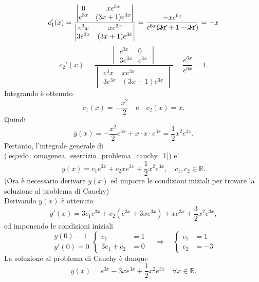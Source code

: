 \begin{example}
	\begin{equation*}
		c_1'(x)=
		\frac{
		\begin{vmatrix}
			0 & x e^{3x}\\
			e^{3x} & (3x+1) e^{3x}
		\end{vmatrix}
		}{
		\begin{vmatrix}
			e^3x & x e^{3x}\\
			3 e^{3x} & (3x+1) e^{3x}
		\end{vmatrix}
		}= \frac{-xe^{6x}}{e^{6x}(\cancel{3x}+1-\cancel{3x})} = -x
	\end{equation*}
	\begin{equation*}
		c_2'(x)=
		\frac{
			\begin{vmatrix}
				e^{3x} & 0\\
				3e^{3x} & e^{3x}
			\end{vmatrix}
		}{
			\begin{vmatrix}
				e^3x & x e^{3x}\\
				3 e^{3x} & (3x+1) e^{3x}
			\end{vmatrix}
		}= \frac{e^{6x}}{e^{6x}} = 1.
	\end{equation*}
	Integrando è ottenuto
	\begin{equation*}
		c_1(x) = -\frac{x^2}{2}\quad\text{e}\quad c_2(x) = x.
	\end{equation*}
	Quindi
	\begin{equation*}
		\bar y(x) = -\frac{x^2}{2} e^{3x} + x\cdot x\cdot e^{3x} = \frac{1}{2} x^2 e^{3x}.
	\end{equation*}
	Pertanto, l'integrale generale di (\ref{eq:edo_omogenea_esercizio_problema_cauchy_1}) e'
	\begin{equation*}
		y(x) = c_1 e^{3x} + c_2 x e^{3x} + \frac{1}{2} x^2 e ^{3x},\quad c_1,c_2\in\mathbb{R}.
	\end{equation*}
	(Ora è necessario derivare $y(x)$ ed imporre le condizioni iniziali per trovare la soluzione al problema di Cauchy)\\
	Derivando $y(x)$ è ottenuto
	\begin{equation*}
		y'(x) = 3c_1 e^{3x} + c_2(e^{3x} + 3xe^{3x}) + xe^{3x} + \frac{3}{2}x^2 e^{3x},
	\end{equation*}
	ed imponendo le condizioni iniziali
	\begin{equation*}
		\begin{matrix}
			y(0) = 1\\
			y'(0) = 0
		\end{matrix}
		\begin{cases}
			c_1 &= 1\\
			3c_1 + c_2 &=0
		\end{cases}\quad\Rightarrow\quad
		\begin{cases}
			c_1 &= 1\\
			c_2 &= -3
		\end{cases}
	\end{equation*}
	La soluzione al problema di Cauchy è dunque
	\begin{equation*}
		y(x) = e^{3x} - 3xe^{3x} + \frac{1}{2} x^2 e^{3x}\quad \forall x\in\mathbb{R}.
	\end{equation*}
\end{example}

